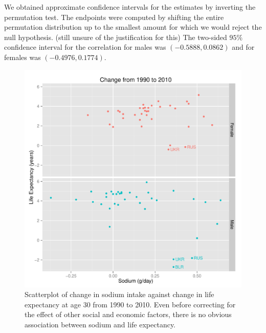 \documentclass{article}
\begin{document}
We obtained approximate confidence intervals for the estimates by inverting the permutation test.  The endpoints were computed by shifting the entire permutation distribution up to the smallest amount for which we would reject the null hypothesis. (still unsure of the justification for this) The two-sided $95\%$ confidence interval for the correlation for males was $(-0.5888, 0.0862)$ and for females was $(-0.4976, 0.1774)$.


\begin{figure}
\centering
\includegraphics[width = \textwidth]{sodium_lifeexp.pdf}
\caption{Scatterplot of change in sodium intake against change in life expectancy at age 30 from 1990 to 2010. Even before correcting for the effect of other social and economic factors, there is no obvious association between sodium and life expectancy.}
\end{figure}
\end{document}
